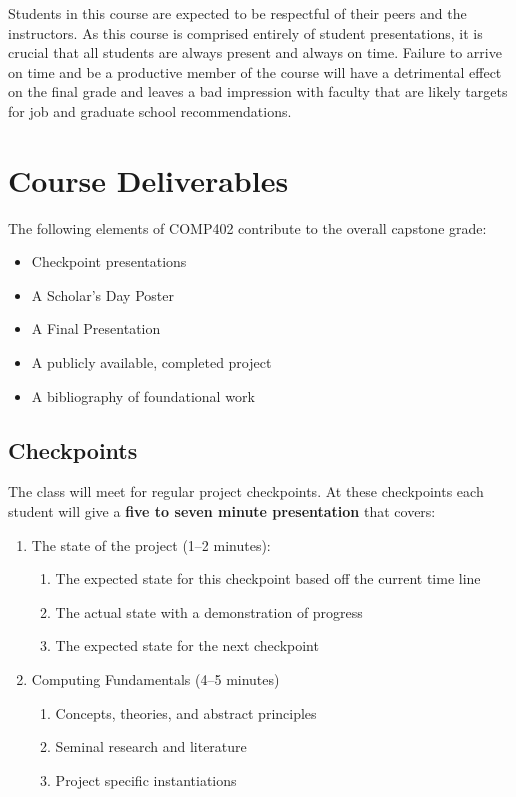 \documentclass[10pt]{article}
\begin{document}
Students in this course are expected to be respectful of their peers and the instructors. As this course is comprised entirely of student presentations, it is crucial that all students are always present and always on time.  Failure to arrive on time and be a productive member of the course will have a detrimental effect on the final grade and leaves a bad impression with faculty that are likely targets for job and graduate school recommendations.

\section{Course Deliverables}

The following elements of COMP402 contribute to the overall capstone grade:
\begin{itemize}
\item Checkpoint presentations
\item A Scholar's Day Poster
\item A Final Presentation
\item A publicly available, completed project
\item A bibliography of foundational work
\end{itemize}


\subsection{Checkpoints}

The class will meet for regular project checkpoints. At these checkpoints each student will give a \textbf{five to seven minute presentation} that covers:
\begin{enumerate}
\item The state of the project (1--2 minutes):
\begin{enumerate}
\item The expected state for this checkpoint based off the current time line
\item The actual state with a demonstration of progress
\item The expected state for the next checkpoint
\end{enumerate}
\item Computing Fundamentals (4--5 minutes)
\begin{enumerate}
\item Concepts, theories, and abstract principles
\item Seminal research and literature
\item Project specific instantiations
\end{enumerate}
\end{enumerate}
\end{document}
